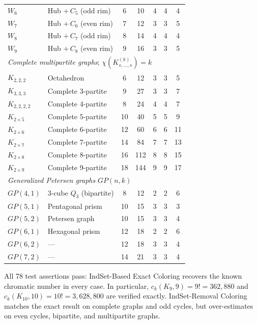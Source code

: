 \documentclass[11pt]{article}
\begin{document}
\begin{table}[ht]
\begin{tabular}{llccccc}
$W_6$ & Hub $+\,C_5$ (odd rim)      & 6  & 10  & 4  & 4  & 4  \\
$W_7$ & Hub $+\,C_6$ (even rim)     & 7  & 12  & 3  & 3  & 5  \\
$W_8$ & Hub $+\,C_7$ (odd rim)      & 8  & 14  & 4  & 4  & 4  \\
$W_9$ & Hub $+\,C_8$ (even rim)     & 9  & 16  & 3  & 3  & 5  \\
\midrule
\multicolumn{7}{l}{\textit{Complete multipartite graphs};
  $\chi(K_{s,\ldots,s}^{(k)}) = k$} \\
$K_{2,2,2}$    & Octahedron          & 6  & 12  & 3  & 3  & 5  \\
$K_{3,3,3}$    & Complete 3-partite  & 9  & 27  & 3  & 3  & 7  \\
$K_{2,2,2,2}$  & Complete 4-partite  & 8  & 24  & 4  & 4  & 7  \\
$K_{2\times5}$ & Complete 5-partite  & 10 & 40  & 5  & 5  & 9  \\
$K_{2\times6}$ & Complete 6-partite  & 12 & 60  & 6  & 6  & 11 \\
$K_{2\times7}$ & Complete 7-partite  & 14 & 84  & 7  & 7  & 13 \\
$K_{2\times8}$ & Complete 8-partite  & 16 & 112 & 8  & 8  & 15 \\
$K_{2\times9}$ & Complete 9-partite  & 18 & 144 & 9  & 9  & 17 \\
\midrule
\multicolumn{7}{l}{\textit{Generalized Petersen graphs} $GP(n,k)$} \\
$GP(4,1)$ & 3-cube $Q_3$ (bipartite) & 8  & 12  & 2  & 2  & 6  \\
$GP(5,1)$ & Pentagonal prism         & 10 & 15  & 3  & 3  & 3  \\
$GP(5,2)$ & Petersen graph           & 10 & 15  & 3  & 3  & 4  \\
$GP(6,1)$ & Hexagonal prism          & 12 & 18  & 2  & 2  & 6  \\
$GP(6,2)$ & ---                      & 12 & 18  & 3  & 3  & 4  \\
$GP(7,2)$ & ---                      & 14 & 21  & 3  & 3  & 4  \\
\bottomrule
\end{tabular}
\end{table}

All 78 test assertions pass: IndSet-Based Exact Coloring recovers the known
chromatic number in every case.  In particular, $c_k(K_9, 9) = 9! = 362{,}880$
and $c_k(K_{10}, 10) = 10! = 3{,}628{,}800$ are verified exactly.
IndSet-Removal Coloring matches the exact result on complete graphs and odd
cycles, but over-estimates on even cycles, bipartite, and multipartite graphs.
\end{document}
